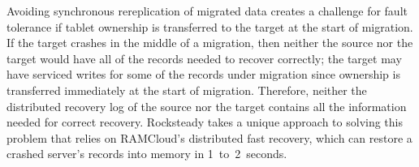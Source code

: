 %
%

Avoiding synchronous rereplication of migrated data creates a
challenge for fault tolerance if tablet ownership is transferred to the target
at the start of migration. If the target crashes in the middle of a migration,
then neither the source nor the target would have all of the records needed to
recover correctly; the target may have serviced writes for some of the records
under migration since ownership is transferred immediately at the start of
migration.  Therefore, neither the distributed recovery log
of the source nor the target contains all the information needed for correct
recovery. Rocksteady takes a unique approach to solving this problem that
relies on RAMCloud's distributed fast recovery, which can restore a crashed
server's records into memory in 1~to~2~seconds.

